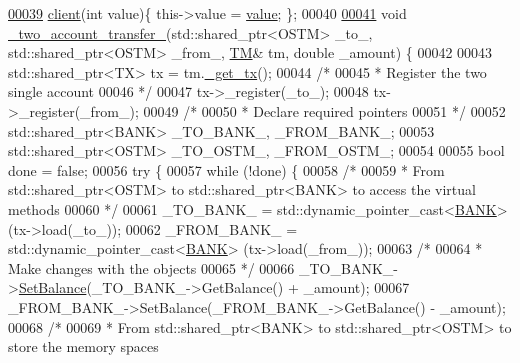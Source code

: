 \begin{DoxyCode}
\hypertarget{client_8h_source.tex_l00039}{}\hyperlink{classclient_a62e0309db8390260d05d8c3084c6fdd4_a62e0309db8390260d05d8c3084c6fdd4}{00039}     \hyperlink{classclient_a62e0309db8390260d05d8c3084c6fdd4_a62e0309db8390260d05d8c3084c6fdd4}{client}(\textcolor{keywordtype}{int} value)\{ this->value = \hyperlink{classclient_a30e2070077d9ba875bfa6616a43d879c_a30e2070077d9ba875bfa6616a43d879c}{value}; \};
00040 
\hypertarget{client_8h_source.tex_l00041}{}\hyperlink{classclient_a71edd1265ba9ae03f71b5dbf54548696_a71edd1265ba9ae03f71b5dbf54548696}{00041}     \textcolor{keywordtype}{void} \hyperlink{classclient_a71edd1265ba9ae03f71b5dbf54548696_a71edd1265ba9ae03f71b5dbf54548696}{\_two\_account\_transfer\_}(std::shared\_ptr<OSTM> \_to\_, std::shared\_ptr<OSTM> 
      \_from\_, \hyperlink{class_t_m}{TM}& tm, \textcolor{keywordtype}{double} \_amount) \{
00042 
00043     std::shared\_ptr<TX> tx = tm.\hyperlink{class_t_m_a41cb0226cc4080c931651b13f74a0075_a41cb0226cc4080c931651b13f74a0075}{\_get\_tx}();
00044     \textcolor{comment}{/*}
00045 \textcolor{comment}{     * Register the two single account}
00046 \textcolor{comment}{     */}
00047     tx->\_register(\_to\_);
00048     tx->\_register(\_from\_);
00049     \textcolor{comment}{/*}
00050 \textcolor{comment}{     * Declare required pointers }
00051 \textcolor{comment}{     */}
00052     std::shared\_ptr<BANK> \_TO\_BANK\_, \_FROM\_BANK\_;
00053     std::shared\_ptr<OSTM> \_TO\_OSTM\_, \_FROM\_OSTM\_;
00054 
00055     \textcolor{keywordtype}{bool} done = \textcolor{keyword}{false};
00056     \textcolor{keywordflow}{try} \{
00057         \textcolor{keywordflow}{while} (!done) \{
00058             \textcolor{comment}{/*}
00059 \textcolor{comment}{             * From std::shared\_ptr<OSTM> to std::shared\_ptr<BANK> to access the virtual methods}
00060 \textcolor{comment}{             */}
00061             \_TO\_BANK\_ = std::dynamic\_pointer\_cast<\hyperlink{class_b_a_n_k}{BANK}> (tx->load(\_to\_));
00062             \_FROM\_BANK\_ = std::dynamic\_pointer\_cast<\hyperlink{class_b_a_n_k}{BANK}> (tx->load(\_from\_));
00063             \textcolor{comment}{/*}
00064 \textcolor{comment}{             * Make changes with the objects}
00065 \textcolor{comment}{             */}
00066             \_TO\_BANK\_->\hyperlink{class_b_a_n_k_ae3e45b407bf8ec7175662442ea24b7c0_ae3e45b407bf8ec7175662442ea24b7c0}{SetBalance}(\_TO\_BANK\_->GetBalance() + \_amount);
00067             \_FROM\_BANK\_->SetBalance(\_FROM\_BANK\_->GetBalance() - \_amount);
00068             \textcolor{comment}{/*}
00069 \textcolor{comment}{             * From std::shared\_ptr<BANK> to std::shared\_ptr<OSTM> to store the memory spaces}

\end{DoxyCode}
